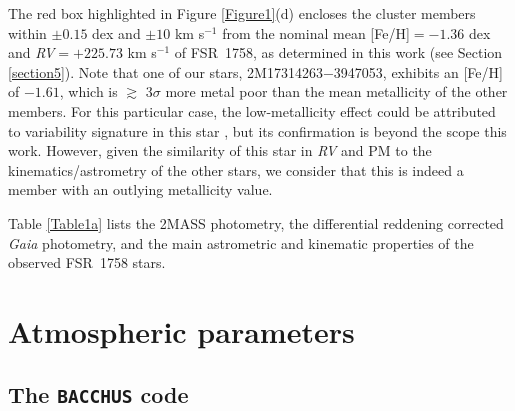 \documentclass[longauth]{aa} %
\begin{document}
The red box highlighted in Figure \ref{Figure1}(d) encloses the cluster members within $\pm0.15$ dex and $\pm10$ km s$^{-1}$ from the nominal mean [Fe/H]$=-1.36$ dex and \textit{RV}$= +225.73$ km s$^{-1}$ of FSR~1758, as determined in this work (see Section \ref{section5}). Note that one of our stars, 2M17314263$-$3947053, exhibits an [Fe/H] of  $-1.61$, which is $\gtrsim$ 3$\sigma$ more metal poor than the mean metallicity of the other members. For this particular case, the low-metallicity effect could be attributed to variability signature in this star \citep[see, e.g.,][for instance]{Munoz2018}, but its confirmation is beyond the scope this work. However, given the similarity of this star in \textit{RV} and PM to the kinematics/astrometry of the other stars, we consider that this is indeed a member with an outlying metallicity value. 

Table \ref{Table1a} lists the 2MASS photometry, the differential reddening corrected \textit{Gaia} photometry, and the main astrometric and kinematic properties of the observed FSR~1758 stars. 

\section{Atmospheric parameters}
\label{section3}

\subsection{The \texttt{BACCHUS} code}
\end{document}
